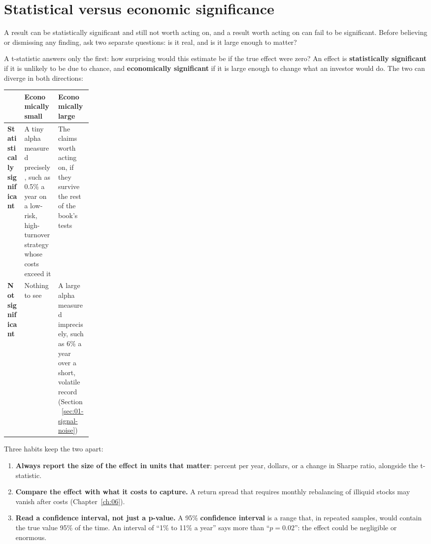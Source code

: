 \section{Statistical versus economic significance}
\label{sec:03-economic}

A result can be statistically significant and still not worth acting on, and a
result worth acting on can fail to be significant. Before believing or
dismissing any finding, ask two separate questions: is it real, and is it
large enough to matter?

A t-statistic answers only the first: how surprising would this estimate be if
the true effect were zero? An effect is \textbf{statistically significant} if it
is unlikely to be due to chance, and \textbf{economically significant} if it is
large enough to change what an investor would do. The two can diverge in both
directions:

\begin{center}
\small
\begin{tabularx}{0.9\linewidth}{@{}>{\raggedright\arraybackslash}p{0.20\linewidth}>{\raggedright\arraybackslash}X>{\raggedright\arraybackslash}X@{}}
\toprule
 & Economically small & Economically large \\
\midrule
\textbf{Statistically significant} & A tiny alpha measured precisely, such as 0.5\% a year on a low-risk, high-turnover strategy whose costs exceed it & The claims worth acting on, if they survive the rest of the book's tests \\
\textbf{Not significant} & Nothing to see & A large alpha measured imprecisely, such as 6\% a year over a short, volatile record (Section~\ref{sec:01-signal-noise}) \\
\bottomrule
\end{tabularx}
\end{center}

Three habits keep the two apart:

\begin{enumerate}
  \item \textbf{Always report the size of the effect in units that matter}: percent per year, dollars, or a change in Sharpe ratio, alongside the t-statistic.
  \item \textbf{Compare the effect with what it costs to capture.} A return spread that requires monthly rebalancing of illiquid stocks may vanish after costs (Chapter~\ref{ch:06}).
  \item \textbf{Read a confidence interval, not just a p-value.} A 95\% \textbf{confidence interval} is a range that, in repeated samples, would contain the true value 95\% of the time. An interval of ``1\% to 11\% a year'' says more than ``$p = 0.02$'': the effect could be negligible or enormous.
\end{enumerate}

